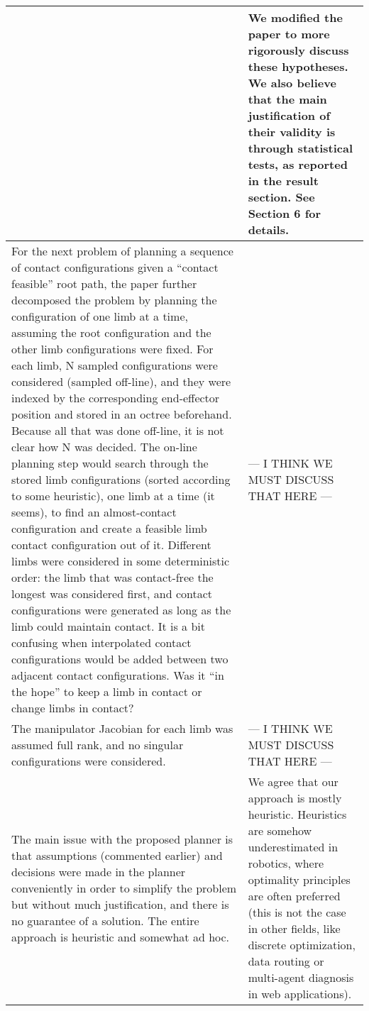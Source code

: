 \documentclass[a4paper]{article}
\begin{document}
\begin{longtable}{|p{21em}|p{21em}|}
&
We modified the paper to more rigorously discuss these hypotheses. 
We also believe that the main justification of their validity is through statistical tests, as reported in the result section.\newline
See Section 6 for details. 
\\ \hline %
For the next problem of planning a sequence of contact configurations given a “contact feasible” root path, the paper further decomposed the problem by planning the configuration of one limb at a time, assuming the root configuration and the other limb configurations were fixed. For each limb, N sampled configurations were considered (sampled off-line), and they were indexed by the corresponding end-effector position and stored in an octree beforehand. 
Because all that was done off-line, it is not clear how N was decided. 
The on-line planning step would search through the stored limb configurations (sorted according to some heuristic), one limb at a time (it seems), to find an almost-contact configuration and create a feasible limb contact configuration out of it. Different limbs were considered in some deterministic order: the limb that was contact-free the longest was considered first, and contact configurations were generated as long as the limb could maintain contact.  It is a bit confusing when interpolated contact configurations would be added between two adjacent contact configurations. Was it “in the hope” to keep a limb in contact or change limbs in contact? 
& 
--- I THINK WE MUST DISCUSS THAT HERE ---
\\ \hline %
The manipulator Jacobian for each limb was assumed full rank, and no singular configurations were considered. 
&
--- I THINK WE MUST DISCUSS THAT HERE ---
\\ \hline %
The main issue with the proposed planner is that assumptions (commented earlier) and decisions were made in the planner conveniently in order to simplify the problem but without much justification, and there is no guarantee of a solution. The entire approach is heuristic and somewhat ad hoc. 
&
We agree that our approach is mostly heuristic.
Heuristics are somehow underestimated in robotics, where optimality principles are often preferred (this is not the case in other fields, like discrete optimization, data routing or multi-agent diagnosis in web applications).


\end{longtable}
\end{document}
